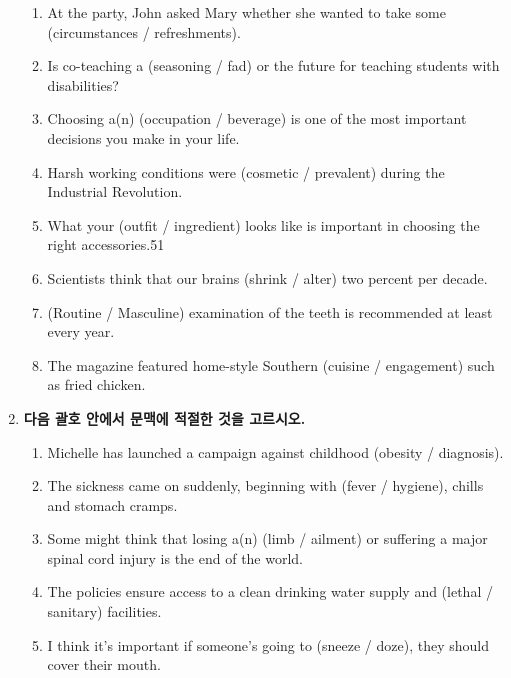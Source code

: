 \documentclass[a4wide,14pt]{extarticle}
\begin{document}
\begin{enumerate}[label=$\spadesuit$]
\begin{enumerate}[label={\textbf{\arabic*.}}]
		 \item At the party, John asked Mary whether she wanted to take some (circumstances / refreshments).

		 \item Is co-teaching a (seasoning / fad) or the future for teaching students with disabilities?

		 \item Choosing a(n) (occupation / beverage) is one of the most important decisions you make in your
		 life.

		 \item Harsh working conditions were (cosmetic / prevalent) during the Industrial Revolution.

		 \item What your (outfit / ingredient) looks like is important in choosing the right accessories.51

		 \item Scientists think that our brains (shrink / alter) two percent per decade.

		 \item (Routine / Masculine) examination of the teeth is recommended at least every year.

		 \item The magazine featured home-style Southern (cuisine / engagement) such as fried chicken.


   \end{enumerate}

\newpage

\item \textbf{다음 괄호 안에서 문맥에 적절한 것을 고르시오.}

	\begin{enumerate}[label={\textbf{\arabic*.}}]

	\item Michelle has launched a campaign against childhood (obesity / diagnosis).

	\item The sickness came on suddenly, beginning with (fever / hygiene), chills and stomach cramps.

	\item Some might think that losing a(n) (limb / ailment) or suffering a major spinal cord injury is the
	end of the world.

	\item The policies ensure access to a clean drinking water supply and (lethal / sanitary) facilities.

	\item I think it's important if someone's going to (sneeze / doze), they should cover their mouth.


\end{enumerate}
\end{enumerate}
\end{document}
